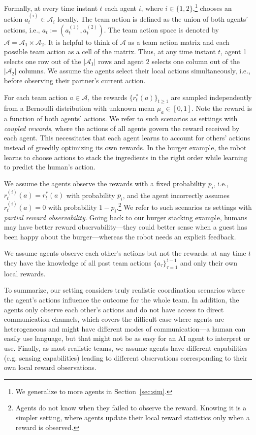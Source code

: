 \documentclass[letterpaper]{article} %
\theoremstyle{definition}
\def\mc{\mathcal}
\begin{document}
Formally, at every time instant $t$ each agent $i$, where $i \in \{1,2\}$,\footnote{We generalize to more agents in Section~\ref{sec:sim}.} chooses an action $a^{(i)}_t \in \mc{A}_i$ locally. The team action is defined as the union of both agents' actions, i.e., $a_t := (a^{(1)}_t, a^{(2)}_t)$. The team action space is denoted by  $\mc{A} = \mc{A}_1 \times \mc{A}_2$. It is helpful to think of $\mc{A}$ as a team action matrix and each possible team action as a cell of the matrix. Thus, at any time instant $t$, agent 1 selects one row out of the $|\mc{A}_1|$ rows and agent 2 selects one column out of the $|\mc{A}_2|$ columns. We assume the agents select their local actions simultaneously, i.e., before observing their partner's current action.

For each team action $a \in \mc{A}$, the rewards $\{r^{\ast}_t(a)\}_{t\geq 1}$ are sampled independently from a Bernoulli distribution with unknown mean $\mu_a \in [0,1]$. Note the reward is a function of both agents' actions. We refer to such scenarios as settings with \emph{coupled rewards}, where the actions of all agents govern the reward received by each agent. This necessitates that each agent learns to account for others' actions instead of greedily optimizing its own rewards. In the burger example, the robot learns to choose actions to stack the ingredients in the right order while learning to predict the human's action.

We assume the agents observe the rewards with a fixed probability $p_i$, i.e., $r^{(i)}_t(a) = r^{\ast}_t(a)$ with probability $p_i$, and the agent incorrectly assumes $r^{(i)}_t(a) = 0$ with probability $1-p_i$.\footnote{Agents do not know when they failed to observe the reward. Knowing it is a simpler setting, where agents update their local reward statistics only when a reward is observed.}
We refer to such scenarios as settings with \emph{partial reward observability}. Going back to our burger stacking example, humans may have better reward observability---they could better sense when a guest has been happy about the burger---whereas the robot needs an explicit feedback.

We assume agents observe each other's actions but not the rewards: at any time $t$ they have the knowledge of all past team actions $\{a_{\tau}\}_{\tau =1}^{t-1}$ and only their own local rewards.

To summarize, our setting considers truly realistic coordination scenarios where the agent's actions influence the outcome for the whole team. In addition, the agents only observe each other's actions and do not have access to direct communication channels, which covers the difficult case where agents are heterogeneous and might have different modes of communication---a human can easily use language, but that might not be as easy for an AI agent to interpret or use. Finally, as most realistic teams, we assume agents have different capabilities (e.g. sensing capabilities) leading to different observations corresponding to their own local reward observations.
\end{document}
